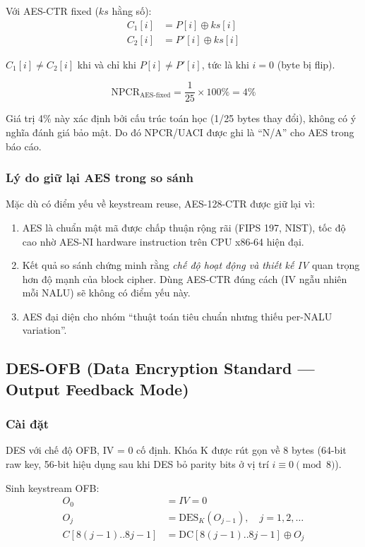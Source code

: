 Với AES-CTR fixed ($ks$ hằng số):
\begin{align}
C_1[i] &= P[i] \oplus ks[i] \\
C_2[i] &= P'[i] \oplus ks[i]
\end{align}

$C_1[i] \neq C_2[i]$ khi và chỉ khi $P[i] \neq P'[i]$, tức là khi $i = 0$ (byte bị flip).

\begin{equation}
\text{NPCR}_{\text{AES-fixed}} = \frac{1}{25} \times 100\% = 4\%
\end{equation}

Giá trị 4\% này xác định bởi cấu trúc toán học (1/25 bytes thay đổi), không có
ý nghĩa đánh giá bảo mật. Do đó NPCR/UACI được ghi là ``N/A'' cho AES trong báo cáo.

\subsubsection{Lý do giữ lại AES trong so sánh}

Mặc dù có điểm yếu về keystream reuse, AES-128-CTR được giữ lại vì:
\begin{enumerate}
  \item AES là chuẩn mật mã được chấp thuận rộng rãi (FIPS 197, NIST), tốc độ cao
        nhờ AES-NI hardware instruction trên CPU x86-64 hiện đại.
  \item Kết quả so sánh chứng minh rằng \emph{chế độ hoạt động và thiết kế IV}
        quan trọng hơn độ mạnh của block cipher. Dùng AES-CTR đúng cách
        (IV ngẫu nhiên mỗi NALU) sẽ không có điểm yếu này.
  \item AES đại diện cho nhóm ``thuật toán tiêu chuẩn nhưng thiếu per-NALU variation''.
\end{enumerate}

\subsection{DES-OFB (Data Encryption Standard --- Output Feedback Mode)}

\subsubsection{Cài đặt}

DES \cite{fips_des} với chế độ OFB, IV = 0 cố định. Khóa K được rút gọn về
8 bytes (64-bit raw key, 56-bit hiệu dụng sau khi DES bỏ parity bits ở vị trí
$i \equiv 0 \pmod{8}$).

Sinh keystream OFB:
\begin{align}
O_0 &= IV = 0 \\
O_j &= \text{DES}_K(O_{j-1}), \quad j = 1, 2, \ldots \\
C[8(j-1)..8j-1] &= \text{DC}[8(j-1)..8j-1] \oplus O_j
\end{align}


